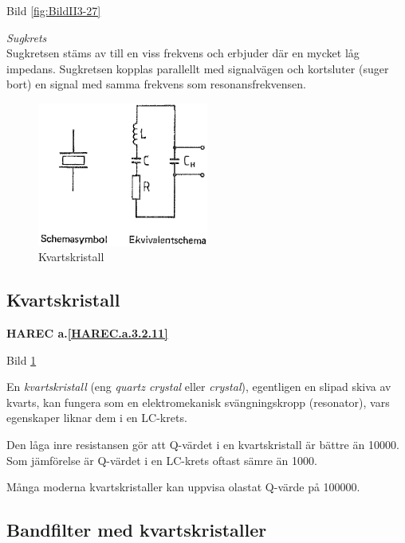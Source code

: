 Bild \ref{fig:BildII3-27}

\emph{Sugkrets} \\
Sugkretsen stäms av till en viss frekvens och erbjuder där en mycket låg
impedans. Sugkretsen kopplas parallellt med signalvägen och kortsluter (suger
bort) en signal med samma frekvens som resonansfrekvensen.

\begin{figure}
\includegraphics[width=0.5\textwidth]{images/bild_2_3-28.png}
\caption{Kvartskristall}
\label{fig:BildII3-28}
\end{figure}

\subsection{Kvartskristall}

\textbf{HAREC a.\ref{HAREC.a.3.2.11}\label{myHAREC.a.3.2.11}}

Bild \ref{fig:BildII3-28}

En \emph{kvartskristall} (eng \emph{quartz crystal} eller \emph{crystal}),
egentligen en slipad skiva av kvarts, kan fungera som en
elektromekanisk svängningskropp (resonator), vars egenskaper liknar dem i en
LC-krets.

Den låga inre resistansen gör att Q-värdet i en kvartskristall är bättre än
10000. Som jämförelse är Q-värdet i en LC-krets oftast sämre än 1000.

Många moderna kvartskristaller kan uppvisa olastat Q-värde på 100000.

\vspace{12pt} %

\subsection{Bandfilter med kvartskristaller}

